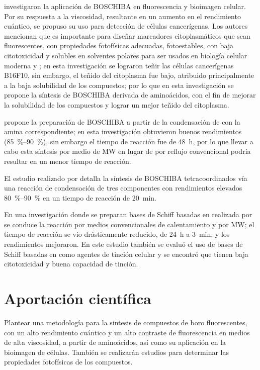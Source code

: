 \documentclass[spanish,mexico,12pt]{scrartcl}
\begin{document}
\textcite{ibarra-rodriguezOrganoboronSchiffBases2019} investigaron la aplicación de \gls{BOSCHIBA} en fluorescencia y bioimagen celular. Por su respuesta a la viscosidad, resultante en un aumento en el rendimiento cuántico, se propuso su uso para detección de células cancerígenas. Los autores mencionan que es importante para diseñar marcadores citoplasmáticos que sean fluorescentes, con propiedades fotofísicas adecuadas, fotoestables, con baja citotoxicidad y solubles en solventes polares para ser usados en biología celular moderna \invitro{} y \invivo{}; en esta investigación se lograron teñir las células cancerígenas B16F10, sin embargo, el teñido del citoplasma fue bajo, atribuido principalmente a la baja solubilidad de los compuestos; por lo que en esta investigación se propone la síntesis de \gls{BOSCHIBA} derivada de aminoácidos, con el fin de mejorar la solubilidad de los compuestos y lograr un mejor teñido del citoplasma.

\textcite{corona-lopezFarRedInfrared2021} propone la preparación de \gls{BOSCHIBA} a partir de la condensación de  con la amina correspondiente; en esta investigación obtuvieron buenos rendimientos  (\qtyrange{85}{90}{\percent}), sin embargo el tiempo de reacción fue de \qty{48}{\hour}, por lo que llevar a cabo esta síntesis por medio de \gls{MW} en lugar de por reflujo convencional podría resultar en un menor tiempo de reacción.

El estudio realizado por \textcite{garcia-lopezNewLuminescentOrganoboron2022} detalla la síntesis de \gls{BOSCHIBA} tetracoordinados vía una reacción de condensación de tres componentes con rendimientos elevados \qtyrange{80}{90}{\percent} en un tiempo de reacción de \qty{20}{\minute}.

En una investigación donde se preparan bases de Schiff basadas en  realizada por \textcite{lopez-espejelOrganotinSchiffBases2021} se conduce la reacción por medios convencionales de calentamiento y por \gls{MW}; el tiempo de reacción se vio drásticamente reducido, de \qty{24}{\hour} a \qty{3}{\minute}, y los rendimientos mejoraron. En este estudio también se evaluó el uso de bases de Schiff basadas en  como agentes de tinción celular y se encontró que tienen baja citotoxicidad y buena capacidad de tinción.



\section{Aportación científica}
Plantear una metodología para la sintesis de compuestos de boro fluorescentes, con un alto rendimiento cuántico y un alto contraste de fluorescencia en medios de alta viscosidad, a partir de aminoácidos, así como su aplicación en la bioimagen de células. También se realizarán estudios \insilico{} para determinar las propiedades fotofísicas de los compuestos.
\end{document}
